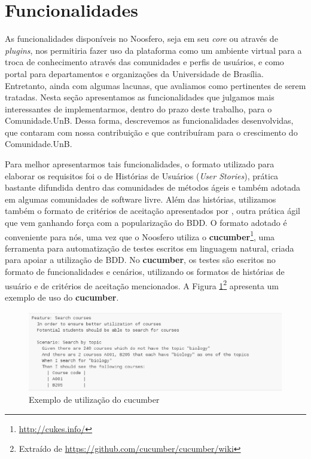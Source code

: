 \section{Funcionalidades}
\label{funcionalidades}



As funcionalidades disponíveis no Noosfero, seja em seu \textit{core}
ou através de \textit{plugins}, nos permitiria fazer uso da plataforma como
um ambiente virtual para a troca de conhecimento através das comunidades e
perfis de usuários, e como portal para departamentos e organizações da
Universidade de Brasília. Entretanto, ainda com algumas lacunas, que avaliamos
como pertinentes de serem tratadas.
%
Nesta seção apresentamos as funcionalidades que julgamos mais interessantes
de implementarmos, dentro do prazo deste trabalho, para o Comunidade.UnB.
%
Dessa forma, descrevemos as funcionalidades desenvolvidas, que contaram com
nossa contribuição e que contribuíram para o crescimento do Comunidade.UnB.


Para melhor apresentarmos tais funcionalidades, o formato utilizado para
elaborar os requisitos foi o de Histórias de Usuários (\textit{User Stories}),
prática bastante difundida dentro das comunidades de métodos ágeis e também
adotada em algumas comunidades de software livre. 
%
Além das histórias, utilizamos também o formato de critérios de aceitação
apresentados por , outra
prática ágil que vem ganhando força com a popularização do BDD.
%
O formato adotado é conveniente para nós, uma vez que o Noosfero utiliza o
\textbf{cucumber}\footnote{\url{http://cukes.info/}}, uma ferramenta para
automatização de testes escritos em linguagem natural, criada para apoiar a
utilização de BDD. No \textbf{cucumber}, os testes são escritos no formato
de funcionalidades e cenários, utilizando os formatos de histórias de
usuário e de critérios de aceitação mencionados. A Figura
\ref{cucumber}\footnote{Extraído de \url{https://github.com/cucumber/cucumber/wiki}}
apresenta um exemplo de uso do \textbf{cucumber}.

\begin{figure}[h]
	\centering
	\includegraphics[keepaspectratio=true,scale=0.6]{figuras/cucumber_sample.eps}
	\caption{Exemplo de utilização do cucumber}
	\label{cucumber}
\end{figure}

